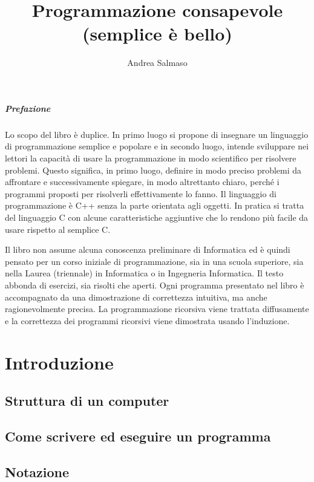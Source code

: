 \documentclass[a4paper,12pt]{book}
\begin{document}
\author{Andrea Salmaso}
\title{Programmazione consapevole \\ (semplice è bello)}
\maketitle

\tableofcontents

\newpage

\paragraph{Prefazione}
Lo scopo del libro è duplice.
In primo luogo si propone di insegnare un linguaggio di programmazione semplice e popolare e in secondo luogo, intende sviluppare nei lettori la capacità di usare la programmazione in modo scientifico per risolvere problemi.
Questo significa, in primo luogo, definire in modo preciso  problemi da affrontare e successivamente spiegare, in modo altrettanto chiaro, perché i programmi proposti per risolverli effettivamente lo fanno.
Il linguaggio di programmazione è C++ senza la parte orientata agli oggetti.
In pratica si tratta del linguaggio C con alcune caratteristiche aggiuntive che lo rendono più facile da usare rispetto al semplice C.

Il libro non assume alcuna conoscenza preliminare di Informatica ed è quindi pensato per un corso iniziale di programmazione, sia in una scuola superiore, sia nella Laurea (triennale) in Informatica o in Ingegneria Informatica.
Il testo abbonda di esercizi, sia risolti che aperti. Ogni programma presentato nel libro è accompagnato da una dimostrazione di correttezza intuitiva, ma anche ragionevolmente precisa.
La programmazione ricorsiva viene trattata diffusamente e la correttezza dei programmi ricorsivi viene dimostrata usando l'induzione.

\chapter{Introduzione}
\section{Struttura di un computer}
\section{Come scrivere ed eseguire un programma}
\section{Notazione}
\end{document}
